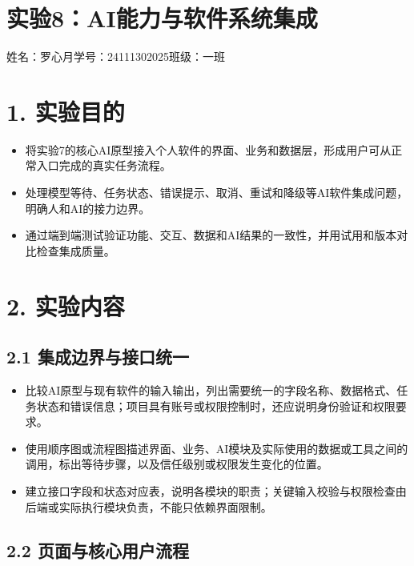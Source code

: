 \documentclass[UTF8,12pt,a4paper]{ctexart}
\def\thelstlisting{8-\arabic{lstlisting}}
\begin{document}
\renewcommand{\thelstlisting}{8-\arabic{lstlisting}}

\section*{实验8：AI能力与软件系统集成}

\begin{center}
姓名：罗心月\qquad 学号：24111302025\qquad 班级：一班
\end{center}

\section*{1. 实验目的}

\begin{itemize}
  \item 将实验7的核心AI原型接入个人软件的界面、业务和数据层，形成用户可从正常入口完成的真实任务流程。
  \item 处理模型等待、任务状态、错误提示、取消、重试和降级等AI软件集成问题，明确人和AI的接力边界。
  \item 通过端到端测试验证功能、交互、数据和AI结果的一致性，并用试用和版本对比检查集成质量。
\end{itemize}

\section*{2. 实验内容}

\subsection*{2.1 集成边界与接口统一}

\begin{itemize}
  \item 比较AI原型与现有软件的输入输出，列出需要统一的字段名称、数据格式、任务状态和错误信息；项目具有账号或权限控制时，还应说明身份验证和权限要求。
  \item 使用顺序图或流程图描述界面、业务、AI模块及实际使用的数据或工具之间的调用，标出等待步骤，以及信任级别或权限发生变化的位置。
  \item 建立接口字段和状态对应表，说明各模块的职责；关键输入校验与权限检查由后端或实际执行模块负责，不能只依赖界面限制。
\end{itemize}

\subsection*{2.2 页面与核心用户流程}
\end{document}
